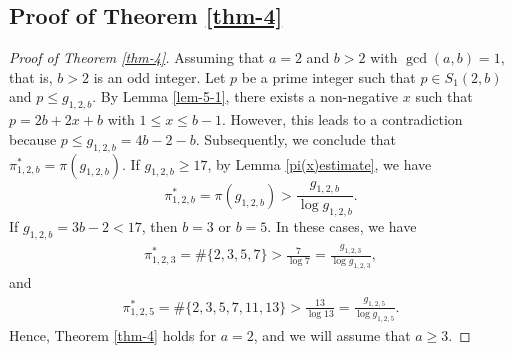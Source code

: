 \documentclass[12pt,a4paper,reqno]{amsart}
\numberwithin{equation}{section}
\theoremstyle{plain}
\theoremstyle{definition}
\begin{document}
\subsection{Proof of Theorem \ref{thm-4}}
\begin{proof}[Proof of Theorem \ref{thm-4}]
Assuming that $a=2$ and $b> 2$ with $\gcd(a,b)=1$, that is, $b>2$ is an odd integer. Let $p$ be a prime integer such that $p\in S_{1}(2,b)$ and $p\leq g_{1,2,b}$. By Lemma \ref{lem-5-1}, there exists a non-negative $x$ such that $p=2b+2x+b$ with $1\leq x\leq b-1$. However, this leads to a contradiction because $p\leq g_{1,2,b}=4b-2-b$. Subsequently, we conclude that $\pi_{1,2,b}^{*}=\pi(g_{1,2,b})$. 
If $g_{1,2,b}\geq 17$, by Lemma \ref{pi(x)estimate}, we have
$$
\pi_{1,2,b}^{*}=\pi(g_{1,2,b})>\frac{g_{1,2,b}}{\log g_{1,2,b}}.
$$
If $g_{1,2,b}=3b-2<17$, then $b=3$ or $b=5$. In these cases, we have
\begin{align*}
	\pi^{*}_{1,2,3}=\#\{2,3,5,7\}>\frac{7}{\log 7}=\frac{g_{1,2,3}}{\log g_{1,2,3}},
\end{align*}
and
\begin{align*}
	\pi^{*}_{1,2,5}=\#\{2,3,5,7,11,13\}>\frac{13}{\log 13}=\frac{g_{1,2,5}}{\log g_{1,2,5}}.
\end{align*}
 Hence, Theorem \ref{thm-4} holds for $a=2$, and we will assume that $a\geq 3$.


\end{proof}
\end{document}
